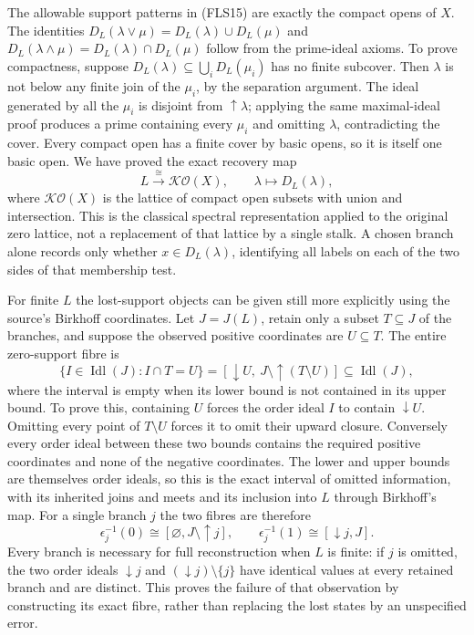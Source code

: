 \documentclass[11pt]{article}
\begin{document}
The allowable support patterns in (FLS15) are exactly
the compact opens of $X$. The identities
$D_L(\lambda\vee\mu)=D_L(\lambda)\cup D_L(\mu)$ and
$D_L(\lambda\wedge\mu)=D_L(\lambda)\cap D_L(\mu)$ follow
from the prime-ideal axioms. To prove compactness, suppose
$D_L(\lambda)\subseteq\bigcup_iD_L(\mu_i)$ has no finite
subcover. Then $\lambda$ is not below any finite join of
the $\mu_i$, by the separation argument. The ideal
generated by all the $\mu_i$ is disjoint from
$\uparrow\lambda$; applying the same maximal-ideal proof
produces a prime containing every $\mu_i$ and omitting
$\lambda$, contradicting the cover. Every compact open
has a finite cover by basic opens, so it is itself one
basic open. We have proved the exact recovery map
\[
L\xrightarrow{\ \cong\ }\mathcal K\mathcal O(X),
\qquad \lambda\longmapsto D_L(\lambda),
\tag{FLS16}
\]
where $\mathcal K\mathcal O(X)$ is the lattice of compact
open subsets with union and intersection. This is the
classical spectral representation applied to the original
zero lattice, not a replacement of that lattice by a
single stalk. A chosen branch alone records only whether
$x\in D_L(\lambda)$, identifying all labels on each of
the two sides of that membership test.

For finite $L$ the lost-support objects can be given still
more explicitly using the source's Birkhoff coordinates.
Let $J=J(L)$, retain only a subset $T\subseteq J$ of the
branches, and suppose the observed positive coordinates
are $U\subseteq T$. The entire zero-support fibre is
\[
\{I\in\operatorname{Idl}(J):I\cap T=U\}
=\left[\downarrow U,\ J\setminus\uparrow(T\setminus U)\right]
\subseteq\operatorname{Idl}(J),
\tag{FLS23}
\]
where the interval is empty when its lower bound is not
contained in its upper bound. To prove this, containing
$U$ forces the order ideal $I$ to contain $\downarrow U$.
Omitting every point of $T\setminus U$ forces it to omit
their upward closure. Conversely every order ideal between
these two bounds contains the required positive coordinates
and none of the negative coordinates. The lower and upper
bounds are themselves order ideals, so this is the exact
interval of omitted information, with its inherited joins
and meets and its inclusion into $L$ through Birkhoff's
map. For a single branch $j$ the two fibres are therefore
\[
\epsilon_j^{-1}(0)\cong
[\varnothing,J\setminus\uparrow j],
\qquad
\epsilon_j^{-1}(1)\cong[\downarrow j,J].
\tag{FLS24}
\]
Every branch is necessary for full reconstruction when $L$
is finite: if $j$ is omitted, the two order ideals
$\downarrow j$ and $(\downarrow j)\setminus\{j\}$ have
identical values at every retained branch and are distinct.
This proves the failure of that observation by constructing
its exact fibre, rather than replacing the lost states by
an unspecified error.
\end{document}
